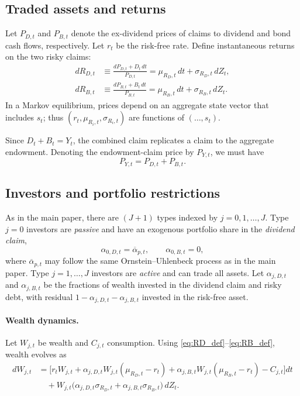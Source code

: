 \documentclass[11pt,english]{article}
\begin{document}
\subsection{Traded assets and returns}

Let $P_{D,t}$ and $P_{B,t}$ denote the ex-dividend prices of claims to dividend and bond cash flows, respectively. Let $r_t$ be the risk-free rate. Define instantaneous returns on the two risky claims:
\begin{align}
    dR_{D,t} &\equiv \frac{dP_{D,t}+D_t\,dt}{P_{D,t}}
    = \mu_{R_D,t}\,dt+\sigma_{R_D,t}\,dZ_t, \label{eq:RD_def}\\
    dR_{B,t} &\equiv \frac{dP_{B,t}+B_t\,dt}{P_{B,t}}
    = \mu_{R_B,t}\,dt+\sigma_{R_B,t}\,dZ_t. \label{eq:RB_def}
\end{align}
In a Markov equilibrium, prices depend on an aggregate state vector that includes $s_t$; thus $(r_t,\mu_{R_i,t},\sigma_{R_i,t})$ are functions of $(\ldots,s_t)$.

Since $D_t+B_t=Y_t$, the combined claim replicates a claim to the aggregate endowment. Denoting the endowment-claim price by $P_{Y,t}$, we must have
\begin{equation}\label{eq:replication_prices}
    P_{Y,t}=P_{D,t}+P_{B,t}.
\end{equation}

\subsection{Investors and portfolio restrictions}

As in the main paper, there are $(J{+}1)$ types indexed by $j=0,1,\ldots,J$. Type $j=0$ investors are \textit{passive} and have an exogenous portfolio share in the \textit{dividend claim},
\[
    \alpha_{0,D,t}=\overline{\alpha}_{p,t},
    \qquad
    \alpha_{0,B,t}=0,
\]
where $\overline{\alpha}_{p,t}$ may follow the same Ornstein--Uhlenbeck process as in the main paper. Type $j=1,\ldots,J$ investors are \emph{active} and can trade all assets. Let $\alpha_{j,D,t}$ and $\alpha_{j,B,t}$ be the fractions of wealth invested in the dividend claim and risky debt, with residual $1-\alpha_{j,D,t}-\alpha_{j,B,t}$ invested in the risk-free asset.

\paragraph{Wealth dynamics.}
Let $W_{j,t}$ be wealth and $C_{j,t}$ consumption. Using \eqref{eq:RD_def}--\eqref{eq:RB_def}, wealth evolves as
\begin{align}\label{eq:wealth_2risky}
    dW_{j,t}
    &=
    \Big[r_t W_{j,t}
    +\alpha_{j,D,t}W_{j,t}\left(\mu_{R_D,t}-r_t\right)
    +\alpha_{j,B,t}W_{j,t}\left(\mu_{R_B,t}-r_t\right)
    -C_{j,t}\Big]dt \\
    &\quad
    +W_{j,t}\Big(\alpha_{j,D,t}\sigma_{R_D,t}+\alpha_{j,B,t}\sigma_{R_B,t}\Big)\,dZ_t. \nonumber
\end{align}
\end{document}
